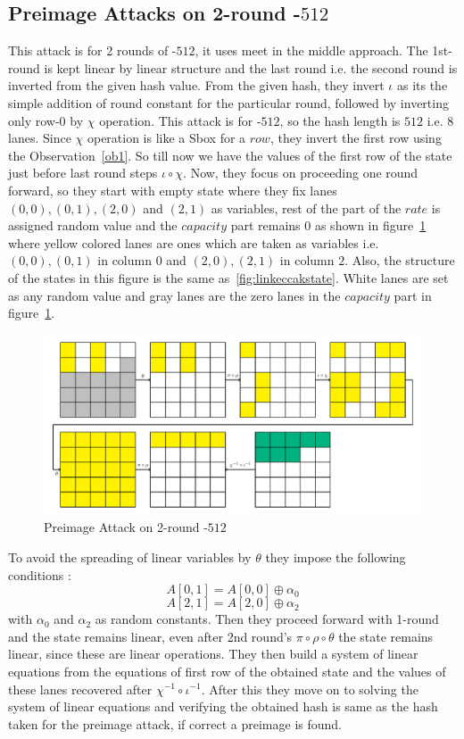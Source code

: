 \subsection{Preimage Attacks on 2-round \KECCAK-$512$}
		This attack is for 2 rounds of \KECCAK-$512$, it uses meet in the middle approach. The 1st-round is kept linear by linear structure and the last round i.e. the second round is inverted from the given hash value. From the given hash, they invert $\iota$ as its the simple addition of round constant for the particular round, followed by inverting only row-$0$ by $\chi$ operation. This attack is for \KECCAK-$512$, so the hash length is $512$ i.e. $8$ lanes. Since $\chi$ operation is like a Sbox for a $row$, they invert the first row using the Observation~\ref{ob1}. So till now we have the values of the first row of the state just before last round steps $\iota \circ \chi$. Now, they focus on proceeding one round forward, so they start with empty state where they fix lanes $(0,0), (0,1), (2,0) $ and $(2,1)$ as variables, rest of the part of the $rate$ is assigned random value and the $capacity$ part remains $0$ as shown in figure~\ref{fig:2rkeccak512} where yellow colored lanes are ones which are taken as variables i.e. $(0,0), (0,1)$ in column $0$ and $(2,0), (2,1)$ in column $2$. Also, the structure of the states in this figure is the same as~\ref{fig:linkeccakstate}. White lanes are set as any random value and gray lanes are the zero lanes in the $capacity$ part in figure~\ref{fig:2rkeccak512}.
		\begin{figure}
            \centering
            \includegraphics[scale=0.6]{2Rkeccak512.pdf}
            \caption{Preimage Attack on 2-round \KECCAK-$512$}
            \label{fig:2rkeccak512}
        \end{figure}
	    To avoid the spreading of linear variables by $\theta$ they impose the following conditions : 
		\[
			A[0, 1] = A[0, 0] \oplus \alpha_{0}
		\]
		\[
			A[2, 1] = A[2, 0] \oplus \alpha_{2}
		\]
		with $\alpha_0$ and $\alpha_2$ as random constants.
		Then they proceed forward with 1-round and the state remains linear, even after 2nd round's $\pi \circ \rho \circ \theta$ the state remains linear, since these are linear operations. They then build a system of linear equations from the equations of first row of the obtained state and the values of these lanes recovered after $\chi^{-1} \circ \iota^{-1}$. After this they move on to solving the system of linear equations and verifying the obtained hash is same as the hash taken for the preimage attack, if correct a preimage is found.
		
